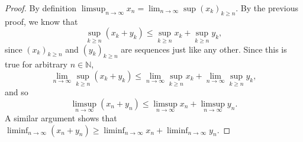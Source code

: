\documentclass[11pt]{amsart}
\begin{document}
\begin{proof}
  By definition $\limsup_{n\rightarrow\infty}x_{n} = \lim_{n\rightarrow\infty}\sup(x_{k})_{k\geq n}$. By the previous proof, we know that 
  \[\sup_{k\geq n}(x_{k} + y_{k}) \leq \sup_{k\geq n}x_{k} + \sup_{k\geq n}y_{k},\]
  since $(x_{k})_{k\geq n}$ and $(y_{k})_{k\geq n}$ are sequences just like any other. Since this is true for arbitrary $n\in\mathbb{N}$,
  \[ \lim_{n\rightarrow\infty}\sup_{k\geq n}(x_{k} + y_{k}) \leq \lim_{n\rightarrow \infty}\sup_{k\geq n}x_{k} + \lim_{n\rightarrow\infty}\sup_{k\geq n}y_{k}, \]
  and so 
  \[ \limsup_{n\rightarrow\infty}(x_{n} + y_{n}) \leq \limsup_{n\rightarrow\infty}x_{n} + \limsup_{n\rightarrow\infty}y_{n}.\]
  A similar argument shows that $\liminf_{n\rightarrow\infty}(x_{n}+y_{n}) \geq \liminf_{n\rightarrow\infty}x_{n} + \liminf_{n\rightarrow\infty}y_{n}$.
\end{proof}
\end{document}
